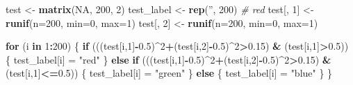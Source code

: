 \documentclass[]{article}
\newenvironment{Shaded}{\begin{snugshade}}{\end{snugshade}}
\newcommand{\CommentTok}[1]{\textcolor[rgb]{0.56,0.35,0.01}{\textit{#1}}}
\newcommand{\ControlFlowTok}[1]{\textcolor[rgb]{0.13,0.29,0.53}{\textbf{#1}}}
\newcommand{\DataTypeTok}[1]{\textcolor[rgb]{0.13,0.29,0.53}{#1}}
\newcommand{\DecValTok}[1]{\textcolor[rgb]{0.00,0.00,0.81}{#1}}
\newcommand{\FloatTok}[1]{\textcolor[rgb]{0.00,0.00,0.81}{#1}}
\newcommand{\KeywordTok}[1]{\textcolor[rgb]{0.13,0.29,0.53}{\textbf{#1}}}
\newcommand{\NormalTok}[1]{#1}
\newcommand{\OperatorTok}[1]{\textcolor[rgb]{0.81,0.36,0.00}{\textbf{#1}}}
\newcommand{\OtherTok}[1]{\textcolor[rgb]{0.56,0.35,0.01}{#1}}
\newcommand{\StringTok}[1]{\textcolor[rgb]{0.31,0.60,0.02}{#1}}
\begin{document}
\begin{Shaded}
\begin{Highlighting}[]
\NormalTok{test <-}\StringTok{ }\KeywordTok{matrix}\NormalTok{(}\OtherTok{NA}\NormalTok{, }\DecValTok{200}\NormalTok{, }\DecValTok{2}\NormalTok{)}
\NormalTok{test_label <-}\StringTok{ }\KeywordTok{rep}\NormalTok{(}\StringTok{''}\NormalTok{, }\DecValTok{200}\NormalTok{)}
\CommentTok{# red}
\NormalTok{test[, }\DecValTok{1}\NormalTok{] <-}\StringTok{ }\KeywordTok{runif}\NormalTok{(}\DataTypeTok{n=}\DecValTok{200}\NormalTok{, }\DataTypeTok{min=}\DecValTok{0}\NormalTok{, }\DataTypeTok{max=}\DecValTok{1}\NormalTok{)}
\NormalTok{test[, }\DecValTok{2}\NormalTok{] <-}\StringTok{ }\KeywordTok{runif}\NormalTok{(}\DataTypeTok{n=}\DecValTok{200}\NormalTok{, }\DataTypeTok{min=}\DecValTok{0}\NormalTok{, }\DataTypeTok{max=}\DecValTok{1}\NormalTok{)}

\ControlFlowTok{for}\NormalTok{ (i }\ControlFlowTok{in} \DecValTok{1}\OperatorTok{:}\DecValTok{200}\NormalTok{) \{}
  \ControlFlowTok{if}\NormalTok{ (((test[i,}\DecValTok{1}\NormalTok{]}\OperatorTok{-}\FloatTok{0.5}\NormalTok{)}\OperatorTok{^}\DecValTok{2}\OperatorTok{+}\NormalTok{(test[i,}\DecValTok{2}\NormalTok{]}\OperatorTok{-}\FloatTok{0.5}\NormalTok{)}\OperatorTok{^}\DecValTok{2}\OperatorTok{>}\FloatTok{0.15}\NormalTok{) }\OperatorTok{&}\StringTok{ }\NormalTok{(test[i,}\DecValTok{1}\NormalTok{]}\OperatorTok{>}\FloatTok{0.5}\NormalTok{)) \{}
\NormalTok{    test_label[i] =}\StringTok{ "red"}
\NormalTok{  \} }\ControlFlowTok{else} \ControlFlowTok{if}\NormalTok{ (((test[i,}\DecValTok{1}\NormalTok{]}\OperatorTok{-}\FloatTok{0.5}\NormalTok{)}\OperatorTok{^}\DecValTok{2}\OperatorTok{+}\NormalTok{(test[i,}\DecValTok{2}\NormalTok{]}\OperatorTok{-}\FloatTok{0.5}\NormalTok{)}\OperatorTok{^}\DecValTok{2}\OperatorTok{>}\FloatTok{0.15}\NormalTok{) }\OperatorTok{&}\StringTok{ }\NormalTok{(test[i,}\DecValTok{1}\NormalTok{]}\OperatorTok{<=}\FloatTok{0.5}\NormalTok{)) \{}
\NormalTok{    test_label[i] =}\StringTok{ "green"}
\NormalTok{  \} }\ControlFlowTok{else}\NormalTok{ \{}
\NormalTok{    test_label[i] =}\StringTok{ "blue"}
\NormalTok{  \}}
\NormalTok{\}}


\end{Highlighting}
\end{Shaded}
\end{document}
